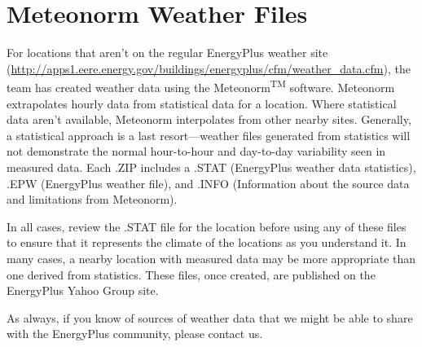 \section{Meteonorm Weather Files}\label{meteonorm-weather-files}

For locations that aren't on the regular EnergyPlus weather site (\url{http://apps1.eere.energy.gov/buildings/energyplus/cfm/weather_data.cfm}), the team has created weather data using the Meteonorm\textsuperscript{TM} software. Meteonorm extrapolates hourly data from statistical data for a location. Where statistical data aren't available, Meteonorm interpolates from other nearby sites. Generally, a statistical approach is a last resort---weather files generated from statistics will not demonstrate the normal hour-to-hour and day-to-day variability seen in measured data. Each .ZIP includes a .STAT (EnergyPlus weather data statistics), .EPW (EnergyPlus weather file), and .INFO (Information about the source data and limitations from Meteonorm).

In all cases, review the .STAT file for the location before using any of these files to ensure that it represents the climate of the locations as you understand it. In many cases, a nearby location with measured data may be more appropriate than one derived from statistics. These files, once created, are published on the EnergyPlus Yahoo Group site.

As always, if you know of sources of weather data that we might be able to share with the EnergyPlus community, please contact us.
